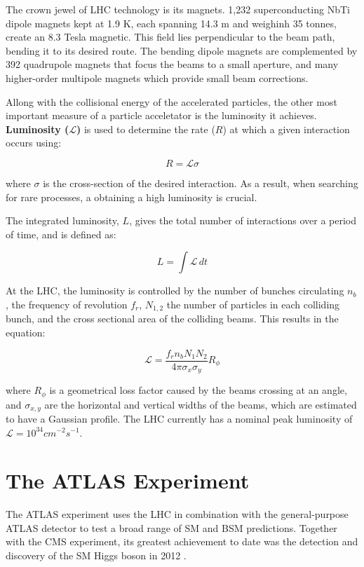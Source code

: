 The crown jewel of LHC technology is its magnets. 1,232 superconducting NbTi dipole magnets kept at 1.9 K, each spanning 14.3 m and weighinh 35 tonnes, create an 8.3 Tesla magnetic. This field lies perpendicular to the beam path, bending it to its desired route. The bending dipole magnets are complemented by 392 quadrupole magnets that focus the beams to a small aperture, and many higher-order multipole magnets which provide small beam corrections.

Allong with the collisional energy of the accelerated particles, the other most important measure of a particle acceletator is the luminosity it achieves. \textbf{Luminosity ($\mathcal{L}$)} is used to determine the rate ($R$) at which a given interaction occurs using:

$$R = \mathcal{L}\sigma$$

where $\sigma$ is the cross-section of the desired interaction. As a result, when searching for rare processes, a obtaining a high luminosity is crucial.

The integrated luminosity, $L$, gives the total number of interactions over a period of time, and is defined as:

$$ L = \int \mathcal{L}\, dt$$

At the LHC, the luminosity is controlled by the number of bunches circulating $n_b$, the frequency of revolution $f_r$, $N_{1,2}$ the number of particles in each colliding bunch, and the cross sectional area of the colliding beams. This results in the equation:

$$\mathcal{L}  = \frac{ f_rn_bN_1N_2 }{4\pi\sigma_x\sigma_y}R_{\phi} $$

where $R_{\phi}$ is a geometrical loss factor caused by the beams crossing at an angle, and $\sigma_{x,y}$ are the horizontal and vertical widths of the beams, which are estimated to have a Gaussian profile. The LHC currently has a nominal peak luminosity of $\mathcal{L} = 10^{34} cm^{-2}s^{-1}$.

\section{The ATLAS Experiment}
\label{section:atlas}

The ATLAS experiment uses the LHC in combination with the general-purpose ATLAS detector to test a broad range of SM and BSM predictions. Together with the CMS experiment, its greatest achievement to date was the detection and discovery of the SM Higgs boson in 2012 \cite{HiggsDiscovery}.

